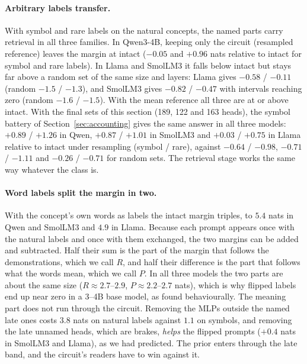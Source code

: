 \documentclass{article}
\begin{document}
\paragraph{Arbitrary labels transfer.} With symbol and rare labels on the natural concepts, the named parts carry retrieval in all three families. In Qwen3-4B, keeping only the circuit (resampled reference) leaves the margin at intact ($-0.05$ and $+0.96$ nats relative to intact for symbol and rare labels). In Llama and SmolLM3 it falls below intact but stays far above a random set of the same size and layers: Llama gives $-0.58$ / $-0.11$ (random $-1.5$ / $-1.3$), and SmolLM3 gives $-0.82$ / $-0.47$ with intervals reaching zero (random $-1.6$ / $-1.5$). With the mean reference all three are at or above intact. With the final sets of this section (189, 122 and 163 heads), the symbol battery of Section~\ref{sec:accounting} gives the same answer in all three models: $+0.89$ / $+1.26$ in Qwen, $+0.87$ / $+1.01$ in SmolLM3 and $+0.03$ / $+0.75$ in Llama relative to intact under resampling (symbol / rare), against $-0.64$ / $-0.98$, $-0.71$ / $-1.11$ and $-0.26$ / $-0.71$ for random sets. The retrieval stage works the same way whatever the class is.

\paragraph{Word labels split the margin in two.} With the concept's own words as labels the intact margin triples, to $5.4$ nats in Qwen and SmolLM3 and $4.9$ in Llama. Because each prompt appears once with the natural labels and once with them exchanged, the two margins can be added and subtracted. Half their sum is the part of the margin that follows the demonstrations, which we call $R$, and half their difference is the part that follows what the words mean, which we call $P$. In all three models the two parts are about the same size ($R\approx2.7$--$2.9$, $P\approx2.2$--$2.7$ nats), which is why flipped labels end up near zero in a 3--4B base model, as \citet{wei2023larger} found behaviourally. The meaning part does not run through the circuit. Removing the MLPs outside the named late ones costs $3.8$ nats on natural labels against $1.1$ on symbols, and removing the late unnamed heads, which are brakes, \emph{helps} the flipped prompts ($+0.4$ nats in SmolLM3 and Llama), as we had predicted. The prior enters through the late band, and the circuit's readers have to win against it.
\end{document}
